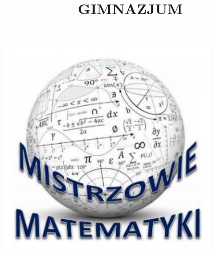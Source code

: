 \documentclass[10pt]{article}
\title{GIMNAZJUM }
\author{}
\date{}
\begin{document}
\maketitle
\begin{center}
\includegraphics[max width=\textwidth]{2024_11_21_e3816fc2ecd6c27612f5g-1}
\end{center}
\end{document}
